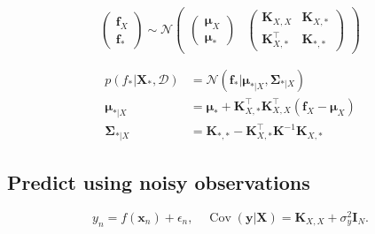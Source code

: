 \documentclass[../main.tex]{subfiles}
\begin{document}
\[
\begin{pmatrix} 
    \boldsymbol{f}_{X} \\ 
    \boldsymbol{f}_{*}
\end{pmatrix}  \sim  \mathcal{N} \begin{pmatrix} 
    \begin{pmatrix} 
        \boldsymbol{\mu}_{X} \\ 
        \boldsymbol{\mu}_{*}
    \end{pmatrix} & \begin{pmatrix} 
        \boldsymbol{K}_{X, X} & \boldsymbol{K}_{X, *}  \\
        \boldsymbol{K}_{X,*}^{\top} & \boldsymbol{K}_{*, *}
    \end{pmatrix} 
\end{pmatrix} 
\]

\[
\begin{aligned}
p(f_{*} | \boldsymbol{X}_{*}, \mathcal{D}) &= \mathcal{N}(\boldsymbol{f}_{*} | \boldsymbol{\mu}_{* | X}, \boldsymbol{\Sigma}_{* | X}) \\
\boldsymbol{\mu}_{* | X} &= \boldsymbol{\mu}_{*} + \boldsymbol{K}_{X, *}^{\top} \boldsymbol{K}_{X, X}^{\top}(\boldsymbol{f}_{X} - \boldsymbol{\mu}_{X}) \\
\boldsymbol{\Sigma}_{* | X} &= \boldsymbol{K}_{*, *} - \boldsymbol{K}_{X, *}^{\top}\boldsymbol{K}^{-1} \boldsymbol{K}_{X, *}
\end{aligned}
\]

\subsection{Predict using noisy observations}

\[
y_{n} = f(\boldsymbol{x}_{n}) + \epsilon_{n}, \quad \operatorname{Cov}(\boldsymbol{y} | \boldsymbol{X}) = \boldsymbol{K}_{X, X} + \sigma_{y}^{2} \boldsymbol{I}_{N}.
\]
\end{document}
